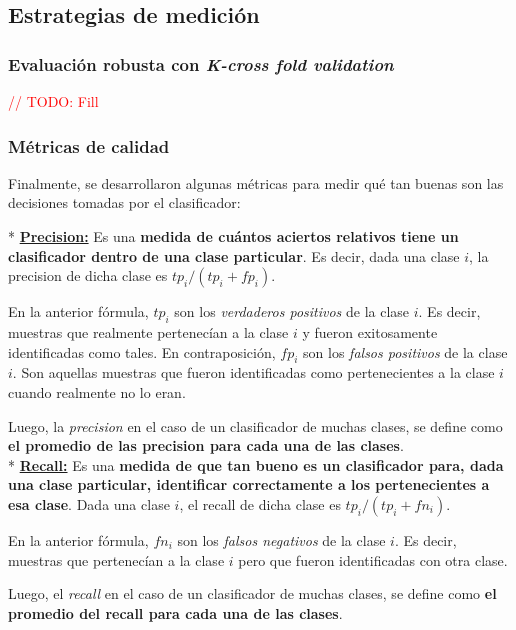 \subsection{Estrategias de medici\'on}

\subsubsection{Evaluaci\'on robusta con \textit{K-cross fold validation}}

\textcolor{red}{// TODO: Fill}

\subsubsection{M\'etricas de calidad}

Finalmente, se desarrollaron algunas m\'etricas para medir qu\'e tan buenas son las decisiones tomadas por el clasificador:

* \underline{\textbf{Precision:}} Es una \textbf{medida de cu\'antos aciertos relativos tiene un clasificador dentro de una clase particular}. Es decir, dada una clase $i$, la precision de dicha clase es $tp_{i} / (tp_{i} + fp_{i})$.

En la anterior f\'ormula, $tp_{i}$ son los \textit{verdaderos positivos} de la clase $i$. Es decir, muestras que realmente pertenec\'ian a la clase $i$ y fueron exitosamente identificadas como tales. En contraposici\'on, $fp_{i}$ son los \textit{falsos positivos} de la clase $i$. Son aquellas muestras que fueron identificadas como pertenecientes a la clase $i$ cuando realmente no lo eran.

Luego, la \textit{precision} en el caso de un clasificador de muchas clases, se define como \textbf{el promedio de las precision para cada una de las clases}. \\

* \underline{\textbf{Recall:}} Es una \textbf{medida de que tan bueno es un clasificador para, dada una clase particular, identificar correctamente a los pertenecientes a esa clase}. Dada una clase $i$, el recall de dicha clase es $tp_{i} / (tp_{i} + fn_{i})$.

En la anterior f\'ormula, $fn_{i}$ son los \textit{falsos negativos} de la clase $i$. Es decir, muestras que pertenec\'ian a la clase $i$ pero que fueron identificadas con otra clase.

Luego, el \textit{recall} en el caso de un clasificador de muchas clases, se define como \textbf{el promedio del recall para cada una de las clases}. \\

